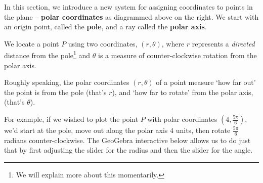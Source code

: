 \documentclass{ximera}
\begin{document}
\begin{image}
\end{image}


In this section, we introduce a new system for assigning coordinates to points in the plane --   \textbf{polar coordinates} as diagrammed above on the right.  We start with an origin point, called the  \textbf{pole}, and a ray called the  \textbf{polar axis}. 

 

We locate a point $P$ using two coordinates, $(r,\theta)$, where $r$ represents a \textit{directed} distance from the pole\footnote{We will explain more about this momentarily.} and $\theta$ is a measure of counter-clockwise rotation from the polar axis.   

 

Roughly speaking,  the polar coordinates $(r,\theta)$ of a point measure `how far out' the point is from the pole (that's $r$), and `how far to rotate' from the polar axis, (that's $\theta$).

 


 For example, if we wished to plot the point $P$ with polar coordinates $\left(4, \frac{5\pi}{6}\right)$, we'd start at the pole, move out along the polar axis $4$ units, then rotate $\frac{5\pi}{6}$ radians counter-clockwise.  The GeoGebra interactive below allows us to do just that by first adjusting the slider for the radius and then the slider for the angle.

\begin{center}
\end{center}
\end{document}
